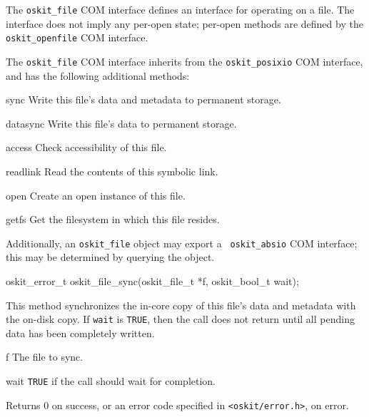 	The {\tt oskit_file} COM interface defines an interface for operating
on a file.  The interface does not imply any per-open state; per-open
methods are defined by the {\tt oskit_openfile} COM interface.

	The {\tt oskit_file} COM interface inherits from the {\tt oskit_posixio} 
COM interface, and has the following additional methods:
\begin{icsymlist}
\item[sync]
	Write this file's data and metadata to permanent storage.
\item[datasync]
	Write this file's data to permanent storage.
\item[access]
	Check accessibility of this file.
\item[readlink]
	Read the contents of this symbolic link.
\item[open]
	Create an open instance of this file.
\item[getfs]
	Get the filesystem in which this file resides.
\end{icsymlist}

	Additionally, an {\tt oskit_file} object may export a {\tt
oskit_absio} COM interface; this may be determined by querying the
object.

\begin{apisyn}

	\funcproto oskit_error_t
	oskit_file_sync(oskit_file_t *f, oskit_bool_t wait); 
\end{apisyn}
\ostofs
\begin{apidesc}
	This method synchronizes the in-core copy of this
	file's data and metadata with the on-disk copy.
	If {\tt wait} is {\tt TRUE}, then the call does not return
	until all pending data has been completely written.
\end{apidesc}
\begin{apiparm}
	\item[f]
		The file to sync.
	\item[wait]
		{\tt TRUE} if the call should wait for completion.
\end{apiparm}
\begin{apiret}
	Returns 0 on success, or an error code specified in
	{\tt <oskit/error.h>}, on error.
\end{apiret}


